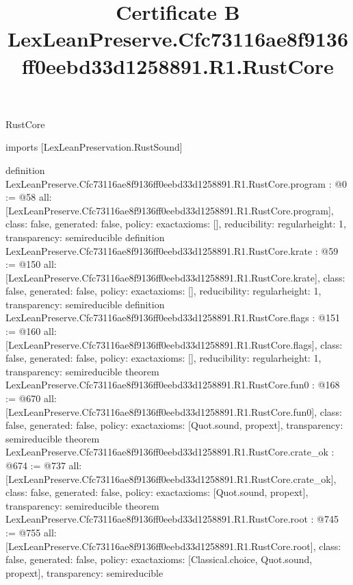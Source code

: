 \begin{lexlean}{RustCore}
\title{Certificate B LexLeanPreserve.Cfc73116ae8f9136ff0eebd33d1258891.R1.RustCore}
\begin{coremodule}
imports [LexLeanPreservation.RustSound]

definition LexLeanPreserve.Cfc73116ae8f9136ff0eebd33d1258891.R1.RustCore.program : @0 := @58 {
  all: [LexLeanPreserve.Cfc73116ae8f9136ff0eebd33d1258891.R1.RustCore.program],
  class: false,
  generated: false,
  policy: exact{axioms: []},
  reducibility: regular{height: 1},
  transparency: semireducible
}
definition LexLeanPreserve.Cfc73116ae8f9136ff0eebd33d1258891.R1.RustCore.krate : @59 := @150 {
  all: [LexLeanPreserve.Cfc73116ae8f9136ff0eebd33d1258891.R1.RustCore.krate],
  class: false,
  generated: false,
  policy: exact{axioms: []},
  reducibility: regular{height: 1},
  transparency: semireducible
}
definition LexLeanPreserve.Cfc73116ae8f9136ff0eebd33d1258891.R1.RustCore.flags : @151 := @160 {
  all: [LexLeanPreserve.Cfc73116ae8f9136ff0eebd33d1258891.R1.RustCore.flags],
  class: false,
  generated: false,
  policy: exact{axioms: []},
  reducibility: regular{height: 1},
  transparency: semireducible
}
theorem LexLeanPreserve.Cfc73116ae8f9136ff0eebd33d1258891.R1.RustCore.fun0 : @168 := @670 {
  all: [LexLeanPreserve.Cfc73116ae8f9136ff0eebd33d1258891.R1.RustCore.fun0],
  class: false,
  generated: false,
  policy: exact{axioms: [Quot.sound, propext]},
  transparency: semireducible
}
theorem LexLeanPreserve.Cfc73116ae8f9136ff0eebd33d1258891.R1.RustCore.crate_ok : @674 := @737 {
  all: [LexLeanPreserve.Cfc73116ae8f9136ff0eebd33d1258891.R1.RustCore.crate_ok],
  class: false,
  generated: false,
  policy: exact{axioms: [Quot.sound, propext]},
  transparency: semireducible
}
theorem LexLeanPreserve.Cfc73116ae8f9136ff0eebd33d1258891.R1.RustCore.root : @745 := @755 {
  all: [LexLeanPreserve.Cfc73116ae8f9136ff0eebd33d1258891.R1.RustCore.root],
  class: false,
  generated: false,
  policy: exact{axioms: [Classical.choice, Quot.sound, propext]},
  transparency: semireducible
}


\end{coremodule}
\end{lexlean}
